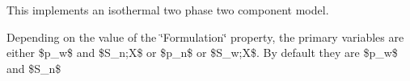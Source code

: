 This implements an isothermal two phase two component model.

Depending on the value of the \char`\"{}Formulation\char`\"{} property, the primary variables are either \$p\_\-w\$ and \$S\_\-n;X\$ or \$p\_\-n\$ or \$S\_\-w;X\$. By default they are \$p\_\-w\$ and \$S\_\-n\$ 
